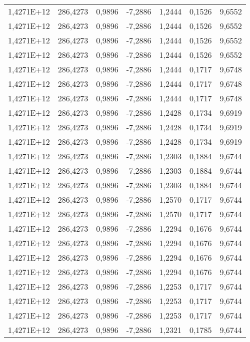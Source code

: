 \begin{table}[htbp]
\begin{tabular}{rrrrrrr}
    1,4271E+12 & 286,4273 & 0,9896 & -7,2886 & 1,2444 & 0,1526 & 9,6552 \\
    1,4271E+12 & 286,4273 & 0,9896 & -7,2886 & 1,2444 & 0,1526 & 9,6552 \\
    1,4271E+12 & 286,4273 & 0,9896 & -7,2886 & 1,2444 & 0,1526 & 9,6552 \\
    1,4271E+12 & 286,4273 & 0,9896 & -7,2886 & 1,2444 & 0,1526 & 9,6552 \\
    1,4271E+12 & 286,4273 & 0,9896 & -7,2886 & 1,2444 & 0,1717 & 9,6748 \\
    1,4271E+12 & 286,4273 & 0,9896 & -7,2886 & 1,2444 & 0,1717 & 9,6748 \\
    1,4271E+12 & 286,4273 & 0,9896 & -7,2886 & 1,2444 & 0,1717 & 9,6748 \\
    1,4271E+12 & 286,4273 & 0,9896 & -7,2886 & 1,2428 & 0,1734 & 9,6919 \\
    1,4271E+12 & 286,4273 & 0,9896 & -7,2886 & 1,2428 & 0,1734 & 9,6919 \\
    1,4271E+12 & 286,4273 & 0,9896 & -7,2886 & 1,2428 & 0,1734 & 9,6919 \\
    1,4271E+12 & 286,4273 & 0,9896 & -7,2886 & 1,2303 & 0,1884 & 9,6744 \\
    1,4271E+12 & 286,4273 & 0,9896 & -7,2886 & 1,2303 & 0,1884 & 9,6744 \\
    1,4271E+12 & 286,4273 & 0,9896 & -7,2886 & 1,2303 & 0,1884 & 9,6744 \\
    1,4271E+12 & 286,4273 & 0,9896 & -7,2886 & 1,2570 & 0,1717 & 9,6744 \\
    1,4271E+12 & 286,4273 & 0,9896 & -7,2886 & 1,2570 & 0,1717 & 9,6744 \\
    1,4271E+12 & 286,4273 & 0,9896 & -7,2886 & 1,2294 & 0,1676 & 9,6744 \\
    1,4271E+12 & 286,4273 & 0,9896 & -7,2886 & 1,2294 & 0,1676 & 9,6744 \\
    1,4271E+12 & 286,4273 & 0,9896 & -7,2886 & 1,2294 & 0,1676 & 9,6744 \\
    1,4271E+12 & 286,4273 & 0,9896 & -7,2886 & 1,2294 & 0,1676 & 9,6744 \\
    1,4271E+12 & 286,4273 & 0,9896 & -7,2886 & 1,2253 & 0,1717 & 9,6744 \\
    1,4271E+12 & 286,4273 & 0,9896 & -7,2886 & 1,2253 & 0,1717 & 9,6744 \\
    1,4271E+12 & 286,4273 & 0,9896 & -7,2886 & 1,2253 & 0,1717 & 9,6744 \\
    1,4271E+12 & 286,4273 & 0,9896 & -7,2886 & 1,2321 & 0,1785 & 9,6744 \\

\end{tabular}
\end{table}
